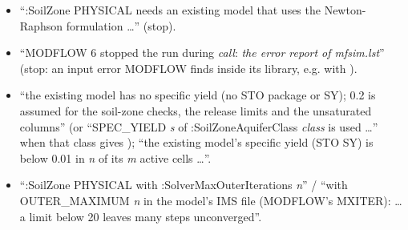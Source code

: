 \begin{itemize}
\emph{z} m) \ldots'' (at set-up: give a head above those cells, or a  series that reaches above them).
\item ``:SoilZone PHYSICAL needs an existing model that uses the Newton-Raphson formulation \ldots'' (stop).
\item ``MODFLOW 6 stopped the run during \emph{call}: \emph{the error report of mfsim.lst}'' (stop: an input error MODFLOW finds
inside its library, e.g.  with ).
\item ``the existing model has no specific yield (no STO package or SY); 0.2 is assumed for the soil-zone checks, the release
limits and the unsaturated columns'' (or ``SPEC\_YIELD \emph{s} of :SoilZoneAquiferClass \emph{class} is used \ldots'' when that
class gives ); ``the existing model's specific yield (STO SY) is below 0.01 in \emph{n} of its \emph{m}
active cells \ldots''.
\item ``:SoilZone PHYSICAL with :SolverMaxOuterIterations \emph{n}'' / ``with OUTER\_MAXIMUM \emph{n} in the model's IMS file
(MODFLOW's MXITER): \ldots a limit below 20 leaves many steps unconverged''.
\end{itemize}

